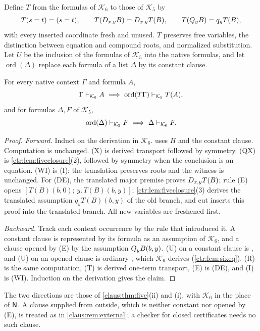 Define $T$ from the formulas of $\mathcal K_6$ to those of $\mathcal K_5$ by
\[
 T(s=t)=(s=t),\qquad T(D_{x,y}B)=D_{x,y}T(B),\qquad T(Q_{y}B)=q_yT(B),
\]
with every inserted coordinate fresh and unused. $T$ preserves free variables, the
distinction between equation and compound roots, and normalized substitution. Let $U$ be the
inclusion of the formulas of $\mathcal K_5$ into the native formulas, and let
$\operatorname{ord}(\Delta)$ replace each formula of a list $\Delta$ by its constant clause.

\begin{theorem}\label{ctr:thm:fivesix}
For every native context $\Gamma$ and formula $A$,
\[
 \Gamma\proves_{\mathcal K_6}A\ \Longrightarrow\
 \operatorname{ord}(T\Gamma)\proves_{\mathcal K_5}T(A),
\]
and for formulas $\Delta,F$ of $\mathcal K_5$,
\[
 \operatorname{ord}(\Delta)\vdash_{\mathcal K_5}F\ \Longrightarrow\
 \Delta\vdash_{\mathcal K_6}F .
\]
\end{theorem}
\begin{proof}
\emph{Forward.} Induct on the derivation in $\mathcal K_6$.  uses $H$ and the
constant clause. Computation is unchanged. (X) is derived transport followed by symmetry.
(QX) is \cref{ctr:lem:fiveclosure}(2), followed by symmetry when the conclusion is an
equation. (WI) is (I): the translation preserves roots and the witness is unchanged. For
(DE), the translated major premise proves $D_{x,y}T(B)$; rule (E) opens
$[T(B)(b,0);\,y.\,T(B)(b,y)]$; \cref{ctr:lem:fiveclosure}(3) derives the translated
assumption $q_yT(B)(b,y)$ of the old branch, and cut inserts this proof into the translated
branch. All new variables are freshened first.

\emph{Backward.} Track each context occurrence by the rule that introduced it. A constant
clause is represented by its formula as an assumption of $\mathcal K_6$, and a clause opened
by (E) by the assumption $Q_{y}B(b,y)$. (U) on a constant clause is \rulename{Hyp}, and (U)
on an opened clause is ordinary \rulename{QE}, which $\mathcal K_6$ derives
(\cref{ctr:lem:sixeq}). (R) is the same computation, (T) is derived one-term transport, (E)
is (DE), and (I) is (WI). Induction on the derivation gives the claim.
\end{proof}

The two directions are those of \cref{claus:thm:five}(ii) and (i), with $\mathcal K_6$ in
the place of $\mathsf{N}$. A clause supplied from outside, which is neither constant nor opened by
(E), is treated as in \cref{claus:rem:external}; a checker for closed certificates needs no
such clause.


